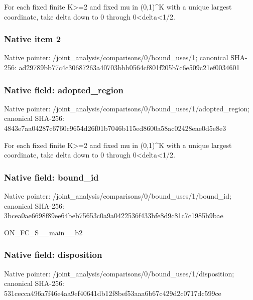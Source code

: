 \documentclass[10pt,a4paper]{article}
\begin{document}
\begingroup\raggedright\sloppy For each fixed finite K>=\allowbreak{}2 and fixed mu in (0,\allowbreak{}1)\textasciicircum{}K with a unique largest coordinate,\allowbreak{} take delta down to 0 through 0<delta<1/\allowbreak{}2.\par\endgroup

\subsubsection{Native item 2}
Native pointer: /joint\_\allowbreak{}analysis/comparisons/0/bound\_\allowbreak{}uses/1; canonical SHA-256: ad29789bb77c4c30687263a40703bbb0564cf801f205b7c6e509c21ef0034601

\subsubsection{Native field: adopted\_\allowbreak{}region}
Native pointer: /joint\_\allowbreak{}analysis/comparisons/0/bound\_\allowbreak{}uses/1/adopted\_\allowbreak{}region; canonical SHA-256: 4843e7aa04287c6760c9654d26f01b7046b115ed8600a58ac02428eae0d5e8e3

\begingroup\raggedright\sloppy For each fixed finite K>=\allowbreak{}2 and fixed mu in (0,\allowbreak{}1)\textasciicircum{}K with a unique largest coordinate,\allowbreak{} take delta down to 0 through 0<delta<1/\allowbreak{}2.\par\endgroup

\subsubsection{Native field: bound\_\allowbreak{}id}
Native pointer: /joint\_\allowbreak{}analysis/comparisons/0/bound\_\allowbreak{}uses/1/bound\_\allowbreak{}id; canonical SHA-256: 3bcea0ae6698f89ee64beb75653c0a9a0422536f433bfe8d9c81c7c1985b9bae

\begingroup\raggedright\sloppy ON\_\allowbreak{}FC\_\allowbreak{}S\_\allowbreak{}\_\allowbreak{}main\_\allowbreak{}\_\allowbreak{}b2\par\endgroup

\subsubsection{Native field: disposition}
Native pointer: /joint\_\allowbreak{}analysis/comparisons/0/bound\_\allowbreak{}uses/1/disposition; canonical SHA-256: 531cecca496a7f46e4aa9ef40641db12f8bef53aaa6b67c429d2c0717dc599ce
\end{document}
